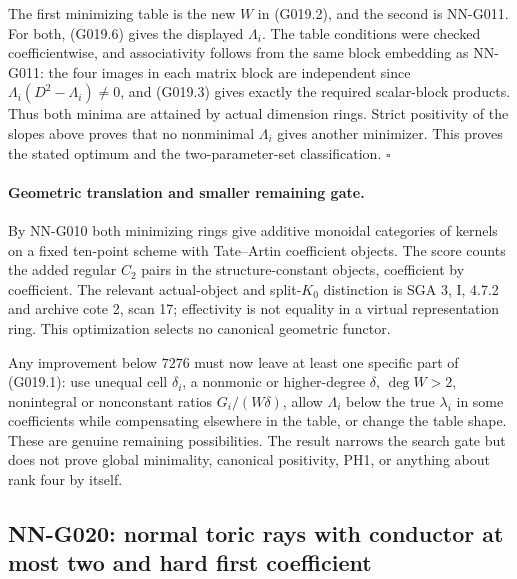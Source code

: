 The first minimizing table is the new $W$ in (G019.2),
and the second is NN-G011. For both, (G019.6) gives the
displayed $\Lambda_i$. The table conditions were checked
coefficientwise, and associativity follows from the same
block embedding as NN-G011: the four images in each matrix
block are independent since $\Lambda_i(D^2-\Lambda_i)\ne0$,
and (G019.3) gives exactly the required scalar-block products.
Thus both minima are attained by actual dimension rings.
Strict positivity of the slopes above proves that no
nonminimal $\Lambda_i$ gives another minimizer. This proves
the stated optimum and the two-parameter-set classification.
\hfill$\square$

\paragraph{Geometric translation and smaller remaining gate.}
By NN-G010 both minimizing rings give additive monoidal
categories of kernels on a fixed ten-point scheme with
Tate--Artin coefficient objects. The score counts the added
regular $C_2$ pairs in the structure-constant objects,
coefficient by coefficient. The relevant actual-object and
split-$K_0$ distinction is SGA 3, I, 4.7.2 and archive cote 2,
scan 17; effectivity is not equality in a virtual representation
ring. This optimization selects no canonical geometric functor.

Any improvement below $7276$ must now leave at least one
specific part of (G019.1): use unequal cell $\delta_i$,
a nonmonic or higher-degree $\delta$, $\deg W>2$,
nonintegral or nonconstant ratios $G_i/(W\delta)$,
allow $\Lambda_i$ below the true $\lambda_i$ in some
coefficients while compensating elsewhere in the table,
or change the table shape. These are genuine remaining
possibilities. The result narrows the search gate but
does not prove global minimality, canonical positivity,
PH1, or anything about rank four by itself.

\subsection{NN-G020: normal toric rays with conductor at most two and hard first coefficient}
